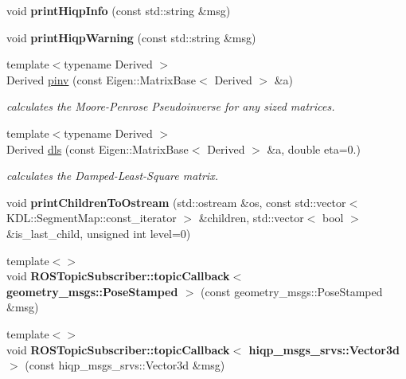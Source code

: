 \begin{DoxyCompactItemize}
\item 
\hypertarget{namespacehiqp_aed9588cb786450e506ca68402880b1d8}{void {\bfseries print\-Hiqp\-Info} (const std\-::string \&msg)}\label{namespacehiqp_aed9588cb786450e506ca68402880b1d8}

\item 
\hypertarget{namespacehiqp_a0993b019bfc0f0e2b38e76b2979eb0e0}{void {\bfseries print\-Hiqp\-Warning} (const std\-::string \&msg)}\label{namespacehiqp_a0993b019bfc0f0e2b38e76b2979eb0e0}

\item 
{\footnotesize template$<$typename Derived $>$ }\\Derived \hyperlink{namespacehiqp_a5762e31938369b2fdbd81ac2bd11ca0f}{pinv} (const Eigen\-::\-Matrix\-Base$<$ Derived $>$ \&a)
\begin{DoxyCompactList}\small\item\em calculates the Moore-\/\-Penrose Pseudoinverse for any sized matrices. \end{DoxyCompactList}\item 
{\footnotesize template$<$typename Derived $>$ }\\Derived \hyperlink{namespacehiqp_a8fb181f069898cddd461b0a33f2f19d1}{dls} (const Eigen\-::\-Matrix\-Base$<$ Derived $>$ \&a, double eta=0.)
\begin{DoxyCompactList}\small\item\em calculates the Damped-\/\-Least-\/\-Square matrix. \end{DoxyCompactList}\item 
\hypertarget{namespacehiqp_a8c04766c4d507563fca71bb11f6beefe}{void {\bfseries print\-Children\-To\-Ostream} (std\-::ostream \&os, const std\-::vector$<$ K\-D\-L\-::\-Segment\-Map\-::const\-\_\-iterator $>$ \&children, std\-::vector$<$ bool $>$ \&is\-\_\-last\-\_\-child, unsigned int level=0)}\label{namespacehiqp_a8c04766c4d507563fca71bb11f6beefe}

\item 
\hypertarget{namespacehiqp_ad0fa6310317e1eef2829957a9b6c0b25}{{\footnotesize template$<$$>$ }\\void {\bfseries R\-O\-S\-Topic\-Subscriber\-::topic\-Callback$<$ geometry\-\_\-msgs\-::\-Pose\-Stamped $>$} (const geometry\-\_\-msgs\-::\-Pose\-Stamped \&msg)}\label{namespacehiqp_ad0fa6310317e1eef2829957a9b6c0b25}

\item 
\hypertarget{namespacehiqp_af211bffb33b796b259656fa391364046}{{\footnotesize template$<$$>$ }\\void {\bfseries R\-O\-S\-Topic\-Subscriber\-::topic\-Callback$<$ hiqp\-\_\-msgs\-\_\-srvs\-::\-Vector3d $>$} (const hiqp\-\_\-msgs\-\_\-srvs\-::\-Vector3d \&msg)}\label{namespacehiqp_af211bffb33b796b259656fa391364046}


\end{DoxyCompactItemize}
